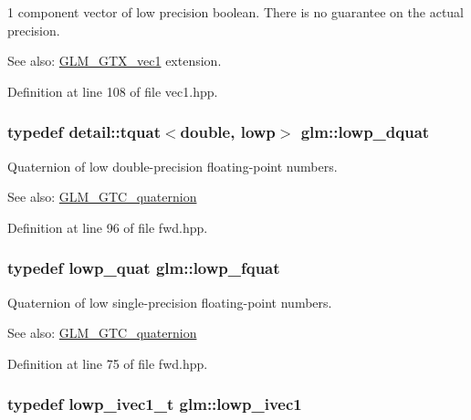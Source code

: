 1 component vector of low precision boolean. There is no guarantee on the actual precision. \begin{Desc}
\item[See also:]\hyperlink{group__gtx__vec1}{GLM\_\-GTX\_\-vec1} extension. \end{Desc}


Definition at line 108 of file vec1.hpp.\hypertarget{namespaceglm_d5f207f07b36f4ebd98338c21b92062e}{
\subsubsection[lowp\_\-dquat]{\setlength{\rightskip}{0pt plus 5cm}typedef detail::tquat$<$double, lowp$>$ {\bf glm::lowp\_\-dquat}}}
\label{namespaceglm_d5f207f07b36f4ebd98338c21b92062e}


Quaternion of low double-precision floating-point numbers.

\begin{Desc}
\item[See also:]\hyperlink{group__gtc__quaternion}{GLM\_\-GTC\_\-quaternion} \end{Desc}


Definition at line 96 of file fwd.hpp.\hypertarget{namespaceglm_ad1f5b3c348c223fb36e28f646552cff}{
\subsubsection[lowp\_\-fquat]{\setlength{\rightskip}{0pt plus 5cm}typedef {\bf lowp\_\-quat} {\bf glm::lowp\_\-fquat}}}
\label{namespaceglm_ad1f5b3c348c223fb36e28f646552cff}


Quaternion of low single-precision floating-point numbers.

\begin{Desc}
\item[See also:]\hyperlink{group__gtc__quaternion}{GLM\_\-GTC\_\-quaternion} \end{Desc}


Definition at line 75 of file fwd.hpp.\hypertarget{namespaceglm_5d781b915bec50a9d5b5383835035533}{
\subsubsection[lowp\_\-ivec1]{\setlength{\rightskip}{0pt plus 5cm}typedef lowp\_\-ivec1\_\-t {\bf glm::lowp\_\-ivec1}}}
\label{namespaceglm_5d781b915bec50a9d5b5383835035533}


